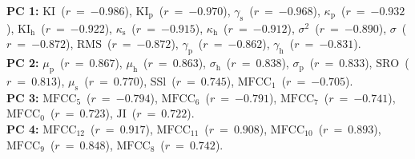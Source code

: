 {\bf{PC 1:}} $\mathrm{KI}$~($r~=~{-0.986}$), $\mathrm{KI_{p}}$~($r~=~{-0.970}$), $\gamma_{\mathrm{s}}$~($r~=~{-0.968}$), $\kappa_{\mathrm{p}}$~($r~=~{-0.932}$), $\mathrm{KI_{h}}$~($r~=~{-0.922}$), $\kappa_{\mathrm{s}}$~($r~=~{-0.915}$), $\kappa_{\mathrm{h}}$~($r~=~{-0.912}$), $\sigma^{2}$~($r~=~{-0.890}$), $\sigma$~($r~=~{-0.872}$), $\mathrm{RMS}$~($r~=~{-0.872}$), $\gamma_{\mathrm{p}}$~($r~=~{-0.862}$), $\gamma_{\mathrm{h}}$~($r~=~{-0.831}$).\vspace{0.5em}\\
{\bf{PC 2:}} $\mu_{\mathrm{p}}$~($r~=~{ 0.867}$), $\mu_{\mathrm{h}}$~($r~=~{ 0.863}$), $\sigma_{\mathrm{h}}$~($r~=~{ 0.838}$), $\sigma_{\mathrm{p}}$~($r~=~{ 0.833}$), $\mathrm{SRO}$~($r~=~{ 0.813}$), $\mu_{\mathrm{s}}$~($r~=~{ 0.770}$), $\mathrm{SSl}$~($r~=~{ 0.745}$), $\mathrm{MFCC}_{1}$~($r~=~{-0.705}$).\vspace{0.5em}\\
{\bf{PC 3:}} $\mathrm{MFCC}_{5}$~($r~=~{-0.794}$), $\mathrm{MFCC}_{6}$~($r~=~{-0.791}$), $\mathrm{MFCC}_{7}$~($r~=~{-0.741}$), $\mathrm{MFCC}_{0}$~($r~=~{ 0.723}$), $\mathrm{JI}$~($r~=~{ 0.722}$).\vspace{0.5em}\\
{\bf{PC 4:}} $\mathrm{MFCC}_{12}$~($r~=~{0.917}$), $\mathrm{MFCC}_{11}$~($r~=~{0.908}$), $\mathrm{MFCC}_{10}$~($r~=~{0.893}$), $\mathrm{MFCC}_{9}$~($r~=~{0.848}$), $\mathrm{MFCC}_{8}$~($r~=~{0.742}$).
